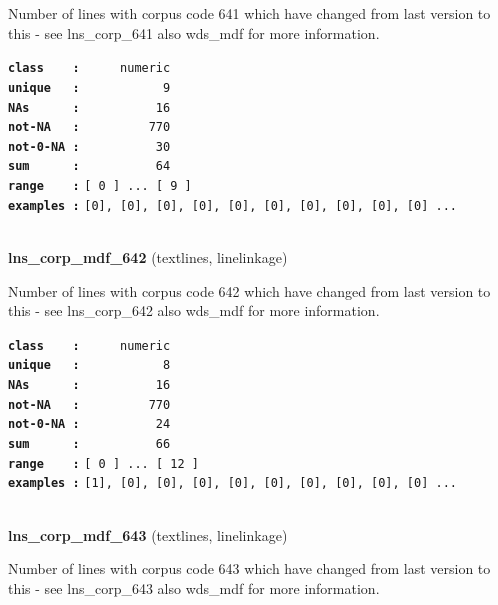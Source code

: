 \documentclass[]{article}
\begin{document}
Number of lines with corpus code 641 which have changed from last
version to this - see lns\_corp\_641 also wds\_mdf for more information.

\textbf{\texttt{class\ \ \ \ :}} \texttt{~~~~~numeric}\\
\textbf{\texttt{unique\ \ \ :}} \texttt{~~~~~~~~~~~9}\\
\textbf{\texttt{NAs\ \ \ \ \ \ :}} \texttt{~~~~~~~~~~16}\\
\textbf{\texttt{not-NA\ \ \ :}} \texttt{~~~~~~~~~770}\\
\textbf{\texttt{not-0-NA\ :}} \texttt{~~~~~~~~~~30}\\
\textbf{\texttt{sum\ \ \ \ \ \ :}} \texttt{~~~~~~~~~~64}\\
\textbf{\texttt{range\ \ \ \ :}}
\texttt{{[}\ 0\ {]}\ ...\ {[}\ 9\ {]}}\\
\textbf{\texttt{examples\ :}}
\texttt{{[}0{]},\ {[}0{]},\ {[}0{]},\ {[}0{]},\ {[}0{]},\ {[}0{]},\ {[}0{]},\ {[}0{]},\ {[}0{]},\ {[}0{]}\ ...}\\

~

\textbf{lns\_corp\_mdf\_642} (textlines, linelinkage)

Number of lines with corpus code 642 which have changed from last
version to this - see lns\_corp\_642 also wds\_mdf for more information.

\textbf{\texttt{class\ \ \ \ :}} \texttt{~~~~~numeric}\\
\textbf{\texttt{unique\ \ \ :}} \texttt{~~~~~~~~~~~8}\\
\textbf{\texttt{NAs\ \ \ \ \ \ :}} \texttt{~~~~~~~~~~16}\\
\textbf{\texttt{not-NA\ \ \ :}} \texttt{~~~~~~~~~770}\\
\textbf{\texttt{not-0-NA\ :}} \texttt{~~~~~~~~~~24}\\
\textbf{\texttt{sum\ \ \ \ \ \ :}} \texttt{~~~~~~~~~~66}\\
\textbf{\texttt{range\ \ \ \ :}}
\texttt{{[}\ 0\ {]}\ ...\ {[}\ 12\ {]}}\\
\textbf{\texttt{examples\ :}}
\texttt{{[}1{]},\ {[}0{]},\ {[}0{]},\ {[}0{]},\ {[}0{]},\ {[}0{]},\ {[}0{]},\ {[}0{]},\ {[}0{]},\ {[}0{]}\ ...}\\

~

\textbf{lns\_corp\_mdf\_643} (textlines, linelinkage)

Number of lines with corpus code 643 which have changed from last
version to this - see lns\_corp\_643 also wds\_mdf for more information.
\end{document}
